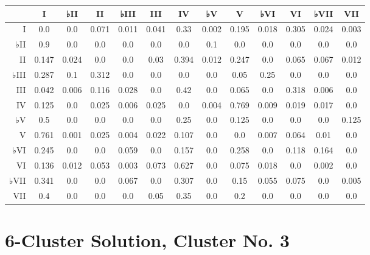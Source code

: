 \begin{table}[htbp]
\begin{minipage}{\linewidth}
\setlength{\tymax}{0.5\linewidth}
\centering
\small
\begin{tabulary}{\textwidth}{@{}RCCCCCCCCCCCC@{}} \toprule
&I&♭II&II&♭III&III&IV&♭V&V&♭VI&VI&♭VII&VII\\
\midrule
I&0.0&0.0&0.071&0.011&0.041&0.33&0.002&0.195&0.018&0.305&0.024&0.003\\
♭II&0.9&0.0&0.0&0.0&0.0&0.0&0.1&0.0&0.0&0.0&0.0&0.0\\
II&0.147&0.024&0.0&0.0&0.03&0.394&0.012&0.247&0.0&0.065&0.067&0.012\\
♭III&0.287&0.1&0.312&0.0&0.0&0.0&0.0&0.05&0.25&0.0&0.0&0.0\\
III&0.042&0.006&0.116&0.028&0.0&0.42&0.0&0.065&0.0&0.318&0.006&0.0\\
IV&0.125&0.0&0.025&0.006&0.025&0.0&0.004&0.769&0.009&0.019&0.017&0.0\\
♭V&0.5&0.0&0.0&0.0&0.0&0.25&0.0&0.125&0.0&0.0&0.0&0.125\\
V&0.761&0.001&0.025&0.004&0.022&0.107&0.0&0.0&0.007&0.064&0.01&0.0\\
♭VI&0.245&0.0&0.0&0.059&0.0&0.157&0.0&0.258&0.0&0.118&0.164&0.0\\
VI&0.136&0.012&0.053&0.003&0.073&0.627&0.0&0.075&0.018&0.0&0.002&0.0\\
♭VII&0.341&0.0&0.0&0.067&0.0&0.307&0.0&0.15&0.055&0.075&0.0&0.005\\
VII&0.4&0.0&0.0&0.0&0.05&0.35&0.0&0.2&0.0&0.0&0.0&0.0\\

\bottomrule

\end{tabulary}
\end{minipage}
\end{table}

\section{6-Cluster Solution, Cluster No. 3}
\label{6-clustersolutionclusterno.3}

